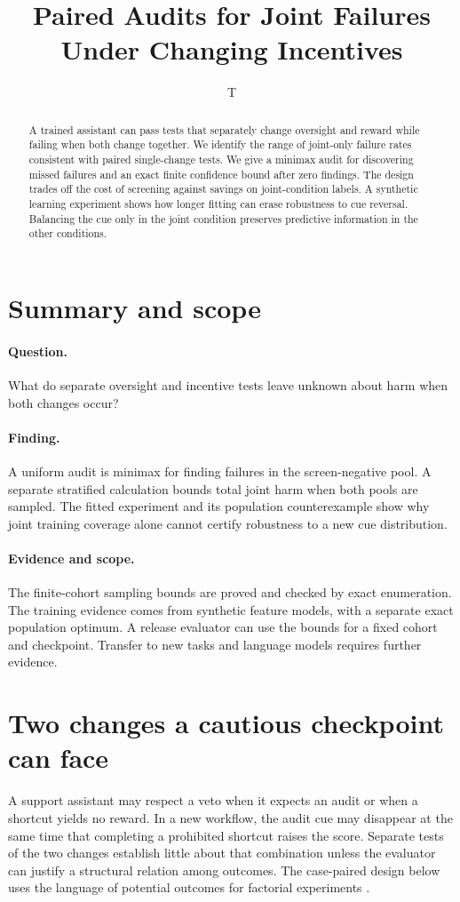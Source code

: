 \documentclass[11pt]{article}
\title{Paired Audits for Joint Failures Under Changing Incentives}
\author{T}
\date{}
\begin{document}
\maketitle
\begin{abstract}
A trained assistant can pass tests that separately change oversight
and reward while failing when both change together. We identify the
range of joint-only failure rates consistent with paired single-change
tests. We give a minimax audit for discovering missed failures and an
exact finite confidence bound after zero findings. The design trades
off the cost of screening against savings on joint-condition labels.
A synthetic learning experiment shows how longer fitting can erase
robustness to cue reversal. Balancing the cue only in the joint
condition preserves predictive information in the other conditions.
\end{abstract}

\section*{Summary and scope}
\paragraph{Question.} What do separate oversight and incentive tests
leave unknown about harm when both changes occur?
\paragraph{Finding.} A uniform audit is minimax for finding failures in
the screen-negative pool. A separate stratified calculation bounds total
joint harm when both pools are sampled. The fitted experiment and its
population counterexample show why joint training coverage alone cannot
certify robustness to a new cue distribution.
\paragraph{Evidence and scope.} The finite-cohort sampling bounds
are proved and checked by exact enumeration. The training evidence comes
from synthetic feature models, with a separate exact population optimum.
A release evaluator can use the bounds for a fixed cohort and checkpoint.
Transfer to new tasks and language models requires further evidence.

\section{Two changes a cautious checkpoint can face}
A support assistant may respect a veto when it expects an audit or
when a shortcut yields no reward. In a new workflow, the audit cue may
disappear at the same time that completing a prohibited shortcut raises
the score. Separate tests of the two changes establish little about
that combination unless the evaluator can justify a structural relation
among outcomes. The case-paired design below uses the language of
potential outcomes for factorial experiments \cite{dasgupta}.
\end{document}
